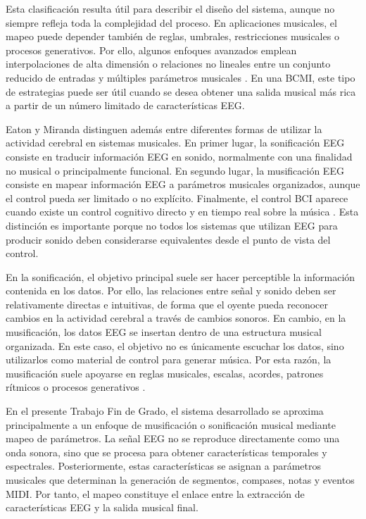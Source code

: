 \documentclass[../main.tex]{subfiles}
\begin{document}
Esta clasificación resulta útil para describir el diseño del sistema, aunque no siempre refleja toda la complejidad del proceso. En aplicaciones musicales, el mapeo puede depender también de reglas, umbrales, restricciones musicales o procesos generativos. Por ello, algunos enfoques avanzados emplean interpolaciones de alta dimensión o relaciones no lineales entre un conjunto reducido de entradas y múltiples parámetros musicales \cite{EatonMiranda2014Mapping}. En una BCMI, este tipo de estrategias puede ser útil cuando se desea obtener una salida musical más rica a partir de un número limitado de características EEG.

Eaton y Miranda distinguen además entre diferentes formas de utilizar la actividad cerebral en sistemas musicales. En primer lugar, la sonificación EEG consiste en traducir información EEG en sonido, normalmente con una finalidad no musical o principalmente funcional. En segundo lugar, la musificación EEG consiste en mapear información EEG a parámetros musicales organizados, aunque el control pueda ser limitado o no explícito. Finalmente, el control BCI aparece cuando existe un control cognitivo directo y en tiempo real sobre la música \cite{EatonMiranda2014Mapping}. Esta distinción es importante porque no todos los sistemas que utilizan EEG para producir sonido deben considerarse equivalentes desde el punto de vista del control.

En la sonificación, el objetivo principal suele ser hacer perceptible la información contenida en los datos. Por ello, las relaciones entre señal y sonido deben ser relativamente directas e intuitivas, de forma que el oyente pueda reconocer cambios en la actividad cerebral a través de cambios sonoros. En cambio, en la musificación, los datos EEG se insertan dentro de una estructura musical organizada. En este caso, el objetivo no es únicamente escuchar los datos, sino utilizarlos como material de control para generar música. Por esta razón, la musificación suele apoyarse en reglas musicales, escalas, acordes, patrones rítmicos o procesos generativos \cite{EatonMiranda2014Mapping}.

En el presente Trabajo Fin de Grado, el sistema desarrollado se aproxima principalmente a un enfoque de musificación o sonificación musical mediante mapeo de parámetros. La señal EEG no se reproduce directamente como una onda sonora, sino que se procesa para obtener características temporales y espectrales. Posteriormente, estas características se asignan a parámetros musicales que determinan la generación de segmentos, compases, notas y eventos MIDI. Por tanto, el mapeo constituye el enlace entre la extracción de características EEG y la salida musical final.
\end{document}
